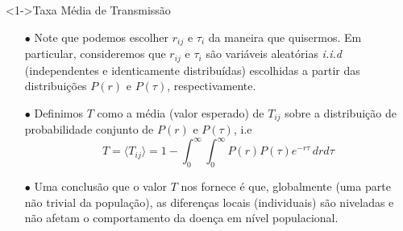 \documentclass{beamer}
\begin{document}
\begin{frame}

\begin{exampleblock}
    <1->{Taxa Média de Transmissão}

    \begin{itemize}
        \item[$\bullet$] Note que podemos escolher $r_{ij}$ e $\tau_i$ da maneira que quisermos. 
            Em particular, consideremos que $r_{ij}$ e $\tau_i$ são variáveis aleatórias 
            \textit{i.i.d} (independentes e identicamente distribuídas) escolhidas a partir das 
            distribuições $P(r)$ e $P(\tau)$, respectivamente. 
        
        \item[$\bullet$] Definimos $T$ como a média (valor esperado) de $T_{ij}$ sobre a distribuição de 
            probabilidade conjunto de $P(r)$ e $P(\tau)$, i.e 
        \begin{equation}
            T = \langle T_{ij} \rangle = 1 - \int_0 ^\infty \int_0 ^\infty P(r) P(\tau) e^{-r \tau} \, dr d\tau
        \end{equation}
        \item[$\bullet$] Uma conclusão que o valor $T$ nos fornece é que, globalmente 
            (uma parte não trivial da população), as diferenças locais (individuais) 
            são niveladas e não afetam o comportamento da doença em nível populacional.
    \end{itemize}


\end{exampleblock}

\end{frame}



\end{document}
